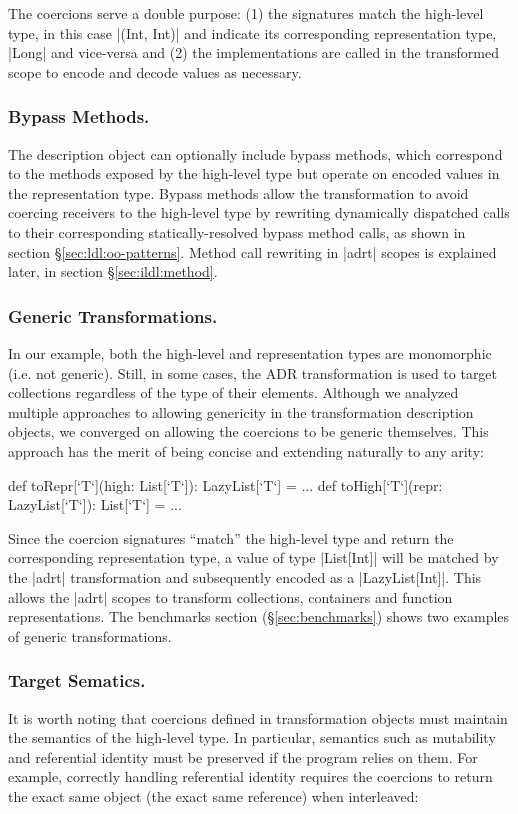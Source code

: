 The coercions serve a double purpose: (1) the signatures match the high-level type, in this case |(Int, Int)| and indicate its corresponding representation type, |Long| and vice-versa and (2) the implementations are called in the transformed scope to encode and decode values as necessary.

\subsubsection{Bypass Methods.} The description object can optionally include bypass methods, which correspond to the methods exposed by the high-level type but operate on encoded values in the representation type. Bypass methods allow the transformation to avoid coercing receivers to the high-level type by rewriting dynamically dispatched calls to their corresponding statically-resolved bypass method calls, as shown in section \S\ref{sec:ldl:oo-patterns}. Method call rewriting in |adrt| scopes is explained later, in section \S\ref{sec:ildl:method}.

\subsubsection{Generic Transformations.} In our example, both the high-level and representation types are monomorphic (i.e. not generic). Still, in some cases, the ADR transformation is used to target collections regardless of the type of their elements. Although we analyzed multiple approaches to allowing genericity in the transformation description objects, we converged on allowing the coercions to be generic themselves. This approach has the merit of being concise and extending naturally to any arity:

\begin{lstlisting-nobreak}
  def toRepr[`T`](high: List[`T`]): LazyList[`T`] = ...
  def toHigh[`T`](repr: LazyList[`T`]): List[`T`] = ...
\end{lstlisting-nobreak}

Since the coercion signatures ``match'' the high-level type and return the corresponding representation type, a value of type |List[Int]| will be matched by the |adrt| transformation and subsequently encoded as a |LazyList[Int]|. This allows the |adrt| scopes to transform collections, containers and function representations. The benchmarks section (\S\ref{sec:benchmarks}) shows two examples of generic transformations.

\subsubsection{Target Sematics.} It is worth noting that coercions defined in transformation objects must maintain the semantics of the high-level type. In particular, semantics such as mutability and referential identity must be preserved if the program relies on them. For example, correctly handling referential identity requires the coercions to return the exact same object (the exact same reference) when interleaved:


